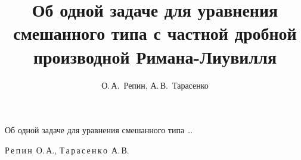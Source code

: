 


 

%

 

 \tableofcontents

 \newpage



\renewcommand{\firstpage}{99}

\renewcommand{\lastpage}{106}

 \newcommand{\bigcom}{\text{\usefont{T2A}{cmfib}{m}{n}\large{\raisebox{1pt}{,}}}} %
















\title{Об одной задаче для уравнения смешанного типа с частной дробной производной Римана-Лиувилля}%

{Об одной задаче для уравнения смешанного типа  \dots}%



\author{О.\,А.~Репин, А.\,В.~Тарасенко}%

{Р\,е\,п\,и\,н~О.\,А.,  Т\,а\,р\,а\,с\,е\,н\,к\,о~А.\,В.}%




